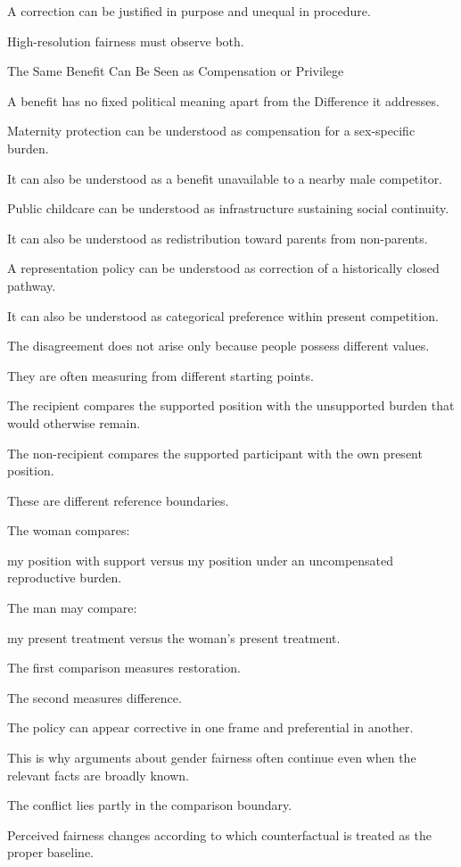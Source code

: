 A correction can be justified in purpose and unequal in procedure.

High-resolution fairness must observe both.

The Same Benefit Can Be Seen as Compensation or Privilege

A benefit has no fixed political meaning apart from the Difference it addresses.

Maternity protection can be understood as compensation for a sex-specific burden.

It can also be understood as a benefit unavailable to a nearby male competitor.

Public childcare can be understood as infrastructure sustaining social continuity.

It can also be understood as redistribution toward parents from non-parents.

A representation policy can be understood as correction of a historically closed pathway.

It can also be understood as categorical preference within present competition.

The disagreement does not arise only because people possess different values.

They are often measuring from different starting points.

The recipient compares the supported position with the unsupported burden that would otherwise remain.

The non-recipient compares the supported participant with the own present position.

These are different reference boundaries.

The woman compares:

my position with support
versus
my position under an uncompensated reproductive burden.

The man may compare:

my present treatment
versus
the woman’s present treatment.

The first comparison measures restoration.

The second measures difference.

The policy can appear corrective in one frame and preferential in another.

This is why arguments about gender fairness often continue even when the relevant facts are broadly known.

The conflict lies partly in the comparison boundary.

Perceived fairness changes according to which counterfactual is treated as the proper baseline.

